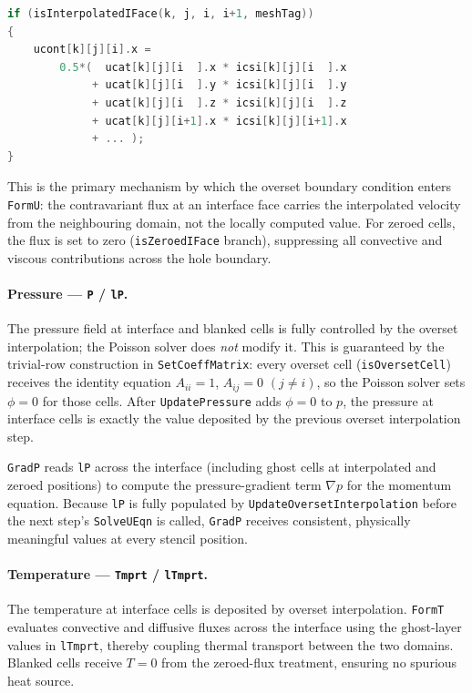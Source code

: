 \documentclass[12pt,a4paper]{article}
\begin{document}
\begin{lstlisting}[style=cstyle, language=C, caption={\texttt{setBackgroundBC} projects interpolated Cartesian velocity to contravariant fluxes.}]
if (isInterpolatedIFace(k, j, i, i+1, meshTag))
{
    ucont[k][j][i].x =
        0.5*(  ucat[k][j][i  ].x * icsi[k][j][i  ].x
             + ucat[k][j][i  ].y * icsi[k][j][i  ].y
             + ucat[k][j][i  ].z * icsi[k][j][i  ].z
             + ucat[k][j][i+1].x * icsi[k][j][i+1].x
             + ... );
}
\end{lstlisting}

This is the primary mechanism by which the overset boundary condition enters
\texttt{FormU}: the contravariant flux at an interface face carries the
interpolated velocity from the neighbouring domain, not the locally computed
value.  For zeroed cells, the flux is set to zero (\texttt{isZeroedIFace}
branch), suppressing all convective and viscous contributions across the
hole boundary.

\paragraph{Pressure — \texttt{P} / \texttt{lP}.}
The pressure field at interface and blanked cells is fully controlled by
the overset interpolation; the Poisson solver does \emph{not} modify it.
This is guaranteed by the trivial-row construction in
\texttt{SetCoeffMatrix}: every overset cell (\texttt{isOversetCell})
receives the identity equation $A_{ii}=1$, $A_{ij}=0$ $(j\neq i)$, so
the Poisson solver sets $\phi=0$ for those cells.
After \texttt{UpdatePressure} adds $\phi=0$ to $p$, the pressure at
interface cells is exactly the value deposited by the previous overset
interpolation step.

\texttt{GradP} reads \texttt{lP} across the interface (including
ghost cells at interpolated and zeroed positions) to compute the
pressure-gradient term $\nabla p$ for the momentum equation.
Because \texttt{lP} is fully populated by \texttt{UpdateOversetInterpolation}
before the next step's \texttt{SolveUEqn} is called, \texttt{GradP}
receives consistent, physically meaningful values at every stencil position.

\paragraph{Temperature — \texttt{Tmprt} / \texttt{lTmprt}.}
The temperature at interface cells is deposited by overset interpolation.
\texttt{FormT} evaluates convective and diffusive fluxes across the interface
using the ghost-layer values in \texttt{lTmprt}, thereby coupling thermal
transport between the two domains.
Blanked cells receive $T=0$ from the zeroed-flux treatment, ensuring
no spurious heat source.
\end{document}

